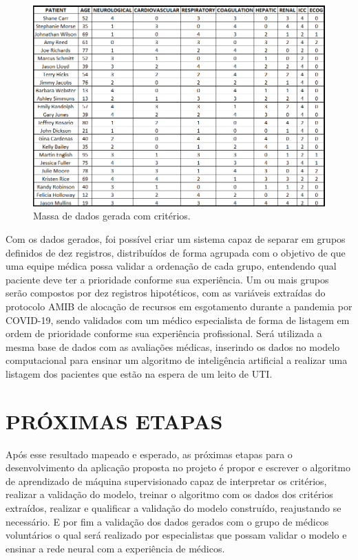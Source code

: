 \documentclass[12pt]{article}
\begin{document}
\begin{figure}[!htb]
    \centering
    \includegraphics[scale=0.6]{img/massa de dados gerada.png}
    \centering
    \caption{Massa de dados gerada com critérios.}
    \label{subexpressao}
\end{figure}

Com os dados gerados, foi possível criar um sistema capaz de separar em grupos definidos de dez registros, distribuídos de forma agrupada com o objetivo de que uma equipe médica possa validar a ordenação de cada grupo, entendendo qual paciente deve ter a prioridade conforme sua experiência. 
Um ou mais grupos serão compostos por dez registros hipotéticos, com as variáveis extraídas do protocolo AMIB de alocação de recursos em esgotamento durante a pandemia por COVID-19, sendo validados com um médico especialista de forma de listagem em ordem de prioridade conforme sua experiência profissional.
Será utilizada a mesma base de dados com as avaliações médicas, inserindo os dados no modelo computacional para ensinar um algoritmo de inteligência artificial a realizar uma listagem dos pacientes que estão na espera de um leito de UTI.

\section{PRÓXIMAS ETAPAS}
Após esse resultado mapeado e esperado, as próximas etapas para o desenvolvimento da aplicação proposta no projeto é propor e escrever o algoritmo de aprendizado de máquina supervisionado capaz de interpretar os critérios, realizar a validação do modelo, treinar o algoritmo com os dados dos critérios extraídos, realizar e qualificar a validação do modelo construído, reajustando se necessário.
E por fim a validação dos dados gerados com o grupo de médicos voluntários o qual será realizado por especialistas que possam validar o modelo e ensinar a rede neural com a experiência de médicos.
\end{document}
